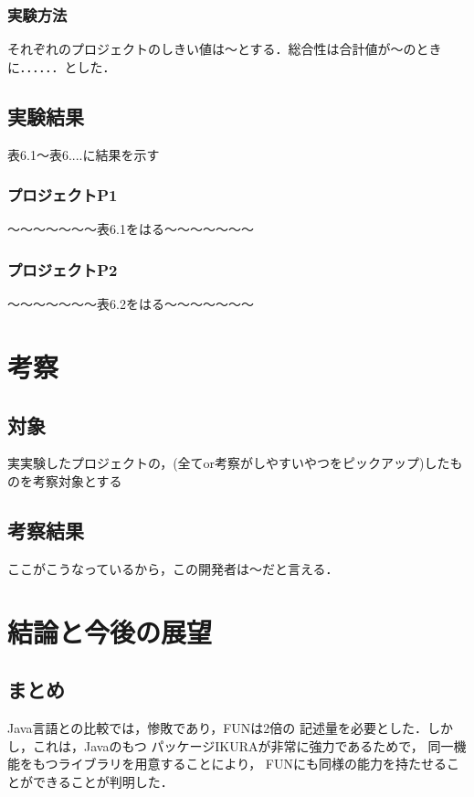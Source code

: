 \documentclass{funthesis}
\begin{document}
\subsection{実験方法}

それぞれのプロジェクトのしきい値は〜とする．総合性は合計値が〜のときに．．．．．．とした．
\section{実験結果}
表6.1〜表6....に結果を示す
\subsection{プロジェクトP1}

〜〜〜〜〜〜〜表6.1をはる〜〜〜〜〜〜〜
\subsection{プロジェクトP2}

〜〜〜〜〜〜〜表6.2をはる〜〜〜〜〜〜〜

\chapter{考察}

\section{対象}
実実験したプロジェクトの，(全てor考察がしやすいやつをピックアップ)したものを考察対象とする
\section{考察結果}

ここがこうなっているから，この開発者は〜だと言える．

\chapter{結論と今後の展望}

\section{まとめ}

Java言語との比較では，惨敗であり，FUNは2倍の
記述量を必要とした．しかし，これは，Javaのもつ
パッケージIKURAが非常に強力であるためで，
同一機能をもつライブラリを用意することにより，
FUNにも同様の能力を持たせることができることが判明した．
\end{document}
